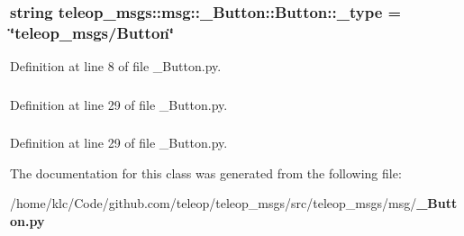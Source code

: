 \subsubsection[{\_\-type}]{\setlength{\rightskip}{0pt plus 5cm}string {\bf teleop\_\-msgs::msg::\_\-Button::Button::\_\-type} = \char`\"{}teleop\_\-msgs/{\bf Button}\char`\"{}\hspace{0.3cm}{\ttfamily  [static, private]}}\label{classteleop__msgs_1_1msg_1_1__Button_1_1Button_a1d3c541b3ae755b73756d7def268c5c3}


Definition at line 8 of file \_\-Button.py.

\subsubsection[{type}]{}\label{classteleop__msgs_1_1msg_1_1__Button_1_1Button_a2777ee1279f28519ea1bb489cbf0ab71}


Definition at line 29 of file \_\-Button.py.

\subsubsection[{value}]{}\label{classteleop__msgs_1_1msg_1_1__Button_1_1Button_acc58ec13bda8243ea0f38904098f25c8}


Definition at line 29 of file \_\-Button.py.



The documentation for this class was generated from the following file:\begin{DoxyCompactItemize}
\item 
/home/klc/Code/github.com/teleop/teleop\_\-msgs/src/teleop\_\-msgs/msg/{\bf \_\-Button.py}\end{DoxyCompactItemize}

